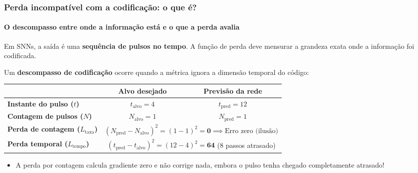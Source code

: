 \begin{frame}
	\frametitle{Perda incompatível com a codificação: o que é?}
	\framesubtitle{O descompasso entre onde a informação está e o que a perda avalia}
	\small
	\par Em SNNs, a saída é uma \textbf{sequência de pulsos no tempo}. A função de perda deve mensurar a grandeza exata onde a informação foi codificada.
	\par Um \textbf{descompasso de codificação} ocorre quando a métrica ignora a dimensão temporal do código:
	\begin{center}
		\footnotesize
		\begin{tabular}{lcc}
			\toprule
			& \textbf{Alvo desejado} & \textbf{Previsão da rede} \\
			\midrule
			\textbf{Instante do pulso ($t$)} & $t_{\mathrm{alvo}} = 4$ & $t_{\mathrm{pred}} = 12$ \\
			\textbf{Contagem de pulsos ($N$)} & $N_{\mathrm{alvo}} = 1$ & $N_{\mathrm{pred}} = 1$ \\
			\midrule
			\textbf{Perda de contagem ($L_{\mathrm{taxa}}$)} & \multicolumn{2}{c}{$(N_{\mathrm{pred}} - N_{\mathrm{alvo}})^2 = (1 - 1)^2 = \mathbf{0} \implies \text{Erro zero (ilusão)}$} \\
			\textbf{Perda temporal ($L_{\mathrm{tempo}}$)} & \multicolumn{2}{c}{$(t_{\mathrm{pred}} - t_{\mathrm{alvo}})^2 = (12 - 4)^2 = \mathbf{64}$ (8 passos atrasado)} \\
			\bottomrule
		\end{tabular}
	\end{center}
	\begin{itemize}
		\setlength{\itemsep}{1pt}
		\item A perda por contagem calcula gradiente zero e não corrige nada, embora o pulso tenha chegado completamente atrasado!
	\end{itemize}
\end{frame}

